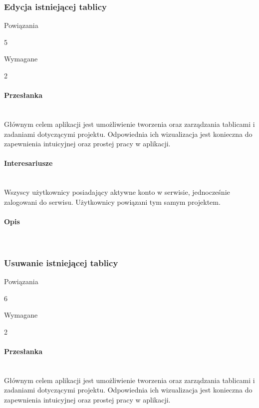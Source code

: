 \documentclass[eng,printmode]{mgr}
\begin{document}
\subsubsection{Edycja istniejącej tablicy}
\begin{labeling}{Powiązania}
\item [ID:] 5
\item [Typ:] Wymagane
\item [Powiązania] 2
\end{labeling}

\paragraph{Przesłanka}\ \\
Głównym celem aplikacji jest umożliwienie tworzenia oraz zarządzania tablicami i zadaniami dotyczącymi projektu. Odpowiednia ich wizualizacja jest konieczna do zapewnienia intuicyjnej oraz prostej pracy w aplikacji.

\paragraph{Interesariusze}\ \\
Wszyscy użytkownicy posiadający aktywne konto w serwisie, jednocześnie zalogowani do serwisu. Użytkownicy powiązani tym samym projektem.

\paragraph{Opis}\ \\
\newpage

\subsubsection{Usuwanie istniejącej tablicy}
\begin{labeling}{Powiązania}
\item [ID:] 6
\item [Typ:] Wymagane
\item [Powiązania] 2
\end{labeling}

\paragraph{Przesłanka}\ \\
Głównym celem aplikacji jest umożliwienie tworzenia oraz zarządzania tablicami i zadaniami dotyczącymi projektu. Odpowiednia ich wizualizacja jest konieczna do zapewnienia intuicyjnej oraz prostej pracy w aplikacji.
\end{document}
